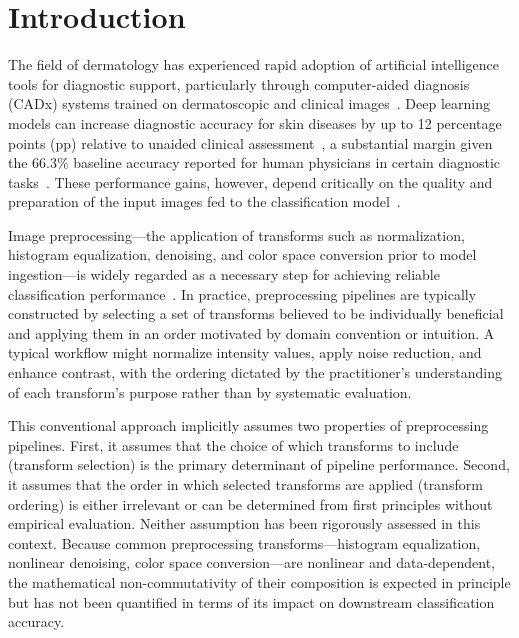 \documentclass[preprint,5p,times,twocolumn]{elsarticle}
\begin{document}
\section{Introduction}
The field of dermatology has experienced rapid adoption of artificial intelligence tools for diagnostic support, particularly through computer-aided diagnosis (CADx) systems trained on dermatoscopic and clinical images~\cite{Krakowski2024}. Deep learning models can increase diagnostic accuracy for skin diseases by up to 12 percentage points (pp) relative to unaided clinical assessment~\cite{Esteva2017, 10.1001/jamanetworkopen.2021.7249, Brinker2019}, a substantial margin given the 66.3\% baseline accuracy reported for human physicians in certain diagnostic tasks~\cite{Barnett2019}. These performance gains, however, depend critically on the quality and preparation of the input images fed to the classification model~\cite{ALHINAI20201, Brinker2019}.

Image preprocessing---the application of transforms such as normalization, histogram equalization, denoising, and color space conversion prior to model ingestion---is widely regarded as a necessary step for achieving reliable classification performance~\cite{RODRIGUES2020103542, 9548351, Tarawneh2024}. In practice, preprocessing pipelines are typically constructed by selecting a set of transforms believed to be individually beneficial and applying them in an order motivated by domain convention or intuition. A typical workflow might normalize intensity values, apply noise reduction, and enhance contrast, with the ordering dictated by the practitioner's understanding of each transform's purpose rather than by systematic evaluation.

This conventional approach implicitly assumes two properties of preprocessing pipelines. First, it assumes that the choice of which transforms to include (transform selection) is the primary determinant of pipeline performance. Second, it assumes that the order in which selected transforms are applied (transform ordering) is either irrelevant or can be determined from first principles without empirical evaluation. Neither assumption has been rigorously assessed in this context. Because common preprocessing transforms---histogram equalization, nonlinear denoising, color space conversion---are nonlinear and data-dependent, the mathematical non-commutativity of their composition is expected in principle but has not been quantified in terms of its impact on downstream classification accuracy.
\end{document}
